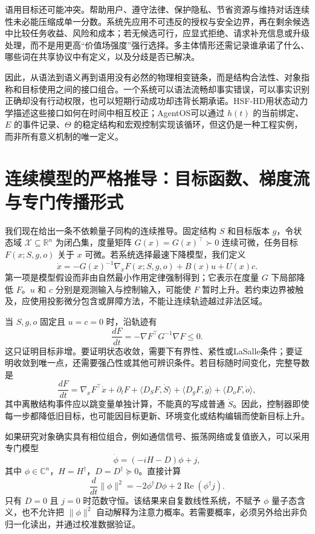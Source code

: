 语用目标还可能冲突。帮助用户、遵守法律、保护隐私、节省资源与维持对话连续性未必能压缩成单一分数。系统先应用不可违反的授权与安全边界，再在剩余候选中比较任务收益、风险和成本；若无候选可行，应显式拒绝、请求补充信息或升级处理，而不是用更高“价值场强度”强行选择。多主体情形还需记录谁承诺了什么、哪些词在共享协议中有定义，以及分歧是否已解决。

因此，从语法到语义再到语用没有必然的物理相变链条，而是结构合法性、对象指称和目标使用之间的接口组合。一个系统可以语法流畅却事实错误，可以事实识别正确却没有行动权限，也可以短期行动成功却违背长期承诺。HSF-HD用状态动力学描述这些接口如何在时间中相互校正；AgentOS可以通过 $h(t)$ 的当前绑定、$E$ 的事件记录、$\Theta$ 的稳定结构和宏观控制实现该循环，但这仍是一种工程实例，而非所有意义机制的唯一定义。

\section{连续模型的严格推导：目标函数、梯度流与专门传播形式}
\label{sec:section_4495}

我们现在给出一条不依赖量子同构的连续推导。固定结构 $S$ 和目标版本 $g$，令状态域 $\mathcal X\subseteq\mathbb R^n$ 为闭凸集，度量矩阵 $G(x)=G(x)^\top\succ0$ 连续可微，任务目标 $F(x;S,g,o)$ 关于 $x$ 可微。若系统选择最速下降模型，我们定义
\begin{equation}
 \dot x=-G(x)^{-1}\nabla_x F(x;S,g,o)+B(x)u+U(x)c.
 \label{eq:hsf_gradient_flow}
\end{equation}
第一项是模型假设而非由自然最小作用定律强制得到；它表示在度量 $G$ 下局部降低 $F$。$u$ 和 $c$ 分别是观测输入与控制输入，可能使 $F$ 暂时上升。若约束边界被触及，应使用投影微分包含或屏障方法，不能让连续轨迹越过非法区域。

当 $S,g,o$ 固定且 $u=c=0$ 时，沿轨迹有
\begin{equation}
 \frac{dF}{dt}=-\nabla F^\top G^{-1}\nabla F\le0.
\end{equation}
这只证明目标非增。要证明状态收敛，需要下有界性、紧性或LaSalle条件；要证明收敛到唯一点，还需要强凸性或其他可辨识条件。若目标随时间变化，完整导数是
\begin{equation}
 \frac{dF}{dt}=\nabla_xF^\top\dot x
 +\partial_tF+\langle D_SF,\dot S\rangle
 +\langle D_gF,\dot g\rangle+\langle D_oF,\dot o\rangle,
\end{equation}
其中离散结构事件应以跳变量单独计算，不能真的写成普通 $\dot S$。因此，控制器即使每一步都降低旧目标，也可能因目标更新、环境变化或结构编辑而使新目标上升。

如果研究对象确实具有相位组合，例如通信信号、振荡网络或复值嵌入，可以采用专门模型
\begin{equation}
 \dot\phi=(-iH-D)\phi+j,
\end{equation}
其中 $\phi\in\mathbb C^n$，$H=H^\dagger$，$D=D^\dagger\succeq0$。直接计算
\begin{equation}
 \frac{d}{dt}\|\phi\|^2=-2\phi^\dagger D\phi
 +2\operatorname{Re}(\phi^\dagger j).
\end{equation}
只有 $D=0$ 且 $j=0$ 时范数守恒。该结果来自复数线性系统，不赋予 $\phi$ 量子态含义，也不允许把 $\|\phi\|^2$ 自动解释为注意力概率。若需要概率，必须另外给出非负归一化读出，并通过校准数据验证。

